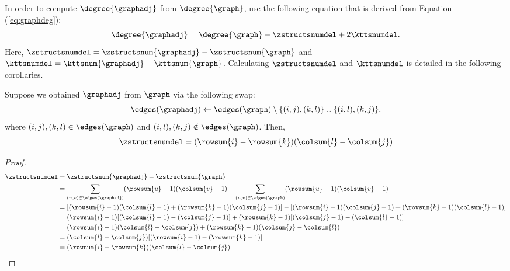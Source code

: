 In order to compute $\degree{\graphadj}$ from $\degree{\graph}$,
\citet{GionisMMT07} use the following equation that is derived from
Equation (\ref{eq:graphdeg}):
\begin{equation}\label{eq:graphadjdeg}
	\degree{\graphadj} = \degree{\graph} - \zstructsnumdel + 2 \kttsnumdel.
\end{equation}
Here, $\zstructsnumdel = \zstructsnum{\graphadj} - \zstructsnum{\graph}$ and
$\kttsnumdel = \kttsnum{\graphadj} - \kttsnum{\graph}$. Calculating
$\zstructsnumdel$ and $\kttsnumdel$ is detailed in the following corollaries.

\begin{corollary}\label{cor:zstructnumdel}
	Suppose we obtained $\graphadj$ from $\graph$ via the following swap:
	\[
		\edges(\graphadj) \leftarrow \edges(\graph) \setminus \{(i, j), (k, l)\}
		\cup \{(i, l), (k, j)\},
	\]
	where $(i, j), (k, l) \in \edges(\graph)$ and $(i, l), (k, j) \notin
	\edges(\graph)$. Then,
	\[
		\zstructsnumdel = (\rowsum{i} - \rowsum{k}) (\colsum{l} - \colsum{j})
	\]
\end{corollary}

\begin{proof}
	\begin{align*}
		\zstructsnumdel &= \zstructsnum{\graphadj} - \zstructsnum{\graph} \\
									 &= \sum_{(u, v) \in \edges(\graphadj)} (\rowsum{u} - 1)
									 (\colsum{v} - 1) - \sum_{(u, v) \in \edges(\graph)}
									 (\rowsum{u} - 1)(\colsum{v} - 1) \\
									 &= [(\rowsum{i} - 1) (\colsum{l} - 1) + (\rowsum{k} - 1)
									 (\colsum{j} - 1)] - [(\rowsum{i} - 1) (\colsum{j} - 1) +
									 (\rowsum{k} - 1) (\colsum{l} - 1)] \\
									 &= (\rowsum{i} - 1) [(\colsum{l} - 1) - (\colsum{j} - 1)] +
									 (\rowsum{k} - 1) [(\colsum{j} - 1) - (\colsum{l} - 1)] \\
									 &= (\rowsum{i} - 1) (\colsum{l} - \colsum{j}) + (\rowsum{k}
									 - 1) (\colsum{j} - \colsum{l}) \\
									 &= (\colsum{l} - \colsum{j}) [(\rowsum{i} - 1) - (\rowsum{k}
									 - 1)] \\
									 &= (\rowsum{i} - \rowsum{k}) (\colsum{l} - \colsum{j})
	\end{align*}
\end{proof}

